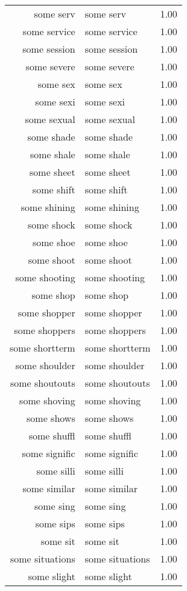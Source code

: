 \begin{table}[ht]
\begin{tabular}{rlr}
  some serv & some serv & 1.00 \\ 
  some service & some service & 1.00 \\ 
  some session & some session & 1.00 \\ 
  some severe & some severe & 1.00 \\ 
  some sex & some sex & 1.00 \\ 
  some sexi & some sexi & 1.00 \\ 
  some sexual & some sexual & 1.00 \\ 
  some shade & some shade & 1.00 \\ 
  some shale & some shale & 1.00 \\ 
  some sheet & some sheet & 1.00 \\ 
  some shift & some shift & 1.00 \\ 
  some shining & some shining & 1.00 \\ 
  some shock & some shock & 1.00 \\ 
  some shoe & some shoe & 1.00 \\ 
  some shoot & some shoot & 1.00 \\ 
  some shooting & some shooting & 1.00 \\ 
  some shop & some shop & 1.00 \\ 
  some shopper & some shopper & 1.00 \\ 
  some shoppers & some shoppers & 1.00 \\ 
  some shortterm & some shortterm & 1.00 \\ 
  some shoulder & some shoulder & 1.00 \\ 
  some shoutouts & some shoutouts & 1.00 \\ 
  some shoving & some shoving & 1.00 \\ 
  some shows & some shows & 1.00 \\ 
  some shuffl & some shuffl & 1.00 \\ 
  some signific & some signific & 1.00 \\ 
  some silli & some silli & 1.00 \\ 
  some similar & some similar & 1.00 \\ 
  some sing & some sing & 1.00 \\ 
  some sips & some sips & 1.00 \\ 
  some sit & some sit & 1.00 \\ 
  some situations & some situations & 1.00 \\ 
  some slight & some slight & 1.00 \\ 

\end{tabular}
\end{table}
